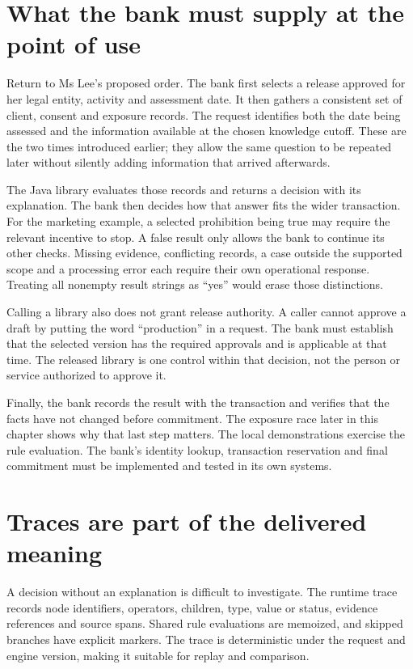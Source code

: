\section{What the bank must supply at the point of use}
\label{sec:reader-java-use}

Return to Ms Lee's proposed order. The bank first selects a release approved for
her legal entity, activity and assessment date. It then gathers a consistent set
of client, consent and exposure records. The request identifies both the date
being assessed and the information available at the chosen knowledge cutoff.
These are the two times introduced earlier; they allow the same question to be
repeated later without silently adding information that arrived afterwards.

The Java library evaluates those records and returns a decision with its
explanation. The bank then decides how that answer fits the wider transaction.
For the marketing example, a selected prohibition being true may require the
relevant incentive to stop. A false result only allows the bank to continue its
other checks. Missing evidence, conflicting records, a case outside the supported
scope and a processing error each require their own operational response. Treating
all nonempty result strings as ``yes'' would erase those distinctions.

Calling a library also does not grant release authority. A caller cannot approve
a draft by putting the word ``production'' in a request. The bank must establish
that the selected version has the required approvals and is applicable at that
time. The released library is one control within that decision, not the person
or service authorized to approve it.

Finally, the bank records the result with the transaction and verifies that the
facts have not changed before commitment. The exposure race later in this chapter
shows why that last step matters. The local demonstrations exercise the rule
evaluation. The bank's identity lookup, transaction reservation and final
commitment must be implemented and tested in its own systems.


\section{Traces are part of the delivered meaning}
\label{merge:M07:10}


A decision without an explanation is difficult to investigate. The runtime trace
records node identifiers, operators, children, type, value or status, evidence
references and source spans. Shared rule evaluations are memoized, and skipped
branches have explicit markers. The trace is deterministic under the request and
engine version, making it suitable for replay and comparison.

